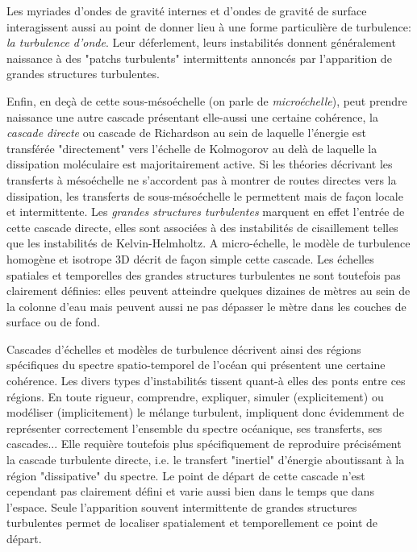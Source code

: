 Les myriades d'ondes de gravité internes et d'ondes de gravité de surface interagissent aussi au point de donner lieu à une forme particulière de turbulence: \textit{la turbulence d'onde}. Leur déferlement, leurs instabilités donnent généralement naissance à des "patchs turbulents" intermittents annoncés par l'apparition de grandes structures turbulentes.

Enfin, en deçà de cette sous-mésoéchelle (on parle de \textit{microéchelle}), peut prendre naissance une autre cascade présentant elle-aussi une certaine cohérence, la \textit{cascade directe} ou cascade de Richardson au sein de laquelle l'énergie est transférée "directement" vers l'échelle de Kolmogorov au delà de laquelle la dissipation moléculaire est majoritairement active. Si les théories décrivant les transferts à mésoéchelle ne s'accordent pas à montrer de routes directes vers la dissipation, les transferts de sous-mésoéchelle le permettent mais de façon locale et intermittente.
Les \textit{grandes structures turbulentes} marquent en effet l'entrée de cette cascade directe, elles sont associées à des instabilités de cisaillement telles que les instabilités de Kelvin-Helmholtz. A micro-échelle, le modèle de turbulence homogène et isotrope 3D décrit de façon simple cette cascade. Les échelles spatiales et temporelles des grandes structures turbulentes ne sont toutefois pas clairement définies: elles peuvent atteindre quelques dizaines de mètres au sein de la colonne d'eau mais peuvent aussi ne pas dépasser le mètre dans les couches de surface ou de fond.

Cascades d'échelles et modèles de turbulence décrivent ainsi des régions spécifiques du spectre spatio-temporel de l'océan qui présentent une certaine cohérence. Les divers types d'instabilités tissent quant-à elles des ponts entre ces régions. En toute rigueur, comprendre, expliquer, simuler (explicitement) ou modéliser (implicitement) le mélange turbulent, impliquent donc évidemment de représenter correctement l'ensemble du spectre océanique, ses transferts, ses cascades... Elle requière toutefois plus spécifiquement de reproduire précisément la cascade turbulente directe, i.e. le transfert "inertiel" d'énergie aboutissant à la région "dissipative" du spectre. Le point de départ de cette cascade n'est cependant pas clairement défini et varie aussi bien dans le temps que dans l'espace. Seule l'apparition souvent intermittente de grandes structures turbulentes permet de localiser spatialement et temporellement ce point de départ.

